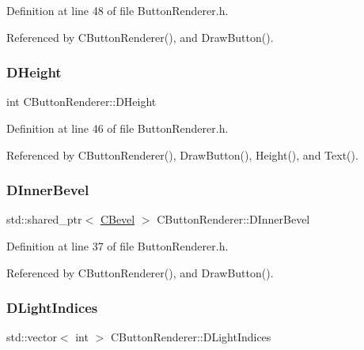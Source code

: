 Definition at line 48 of file Button\+Renderer.\+h.



Referenced by C\+Button\+Renderer(), and Draw\+Button().

\hypertarget{classCButtonRenderer_a7e3d605b90c45d87ac1396c23c90b250}{}\label{classCButtonRenderer_a7e3d605b90c45d87ac1396c23c90b250} 
\subsubsection{\texorpdfstring{D\+Height}{DHeight}}
{\footnotesize\ttfamily int C\+Button\+Renderer\+::\+D\+Height\hspace{0.3cm}{\ttfamily [protected]}}



Definition at line 46 of file Button\+Renderer.\+h.



Referenced by C\+Button\+Renderer(), Draw\+Button(), Height(), and Text().

\hypertarget{classCButtonRenderer_ab3c6dd552abb11fe7cd9db5d71648afb}{}\label{classCButtonRenderer_ab3c6dd552abb11fe7cd9db5d71648afb} 
\subsubsection{\texorpdfstring{D\+Inner\+Bevel}{DInnerBevel}}
{\footnotesize\ttfamily std\+::shared\+\_\+ptr$<$ \hyperlink{classCBevel}{C\+Bevel} $>$ C\+Button\+Renderer\+::\+D\+Inner\+Bevel\hspace{0.3cm}{\ttfamily [protected]}}



Definition at line 37 of file Button\+Renderer.\+h.



Referenced by C\+Button\+Renderer(), and Draw\+Button().

\hypertarget{classCButtonRenderer_a3f72c8f3b860fbaf43a372f112c11156}{}\label{classCButtonRenderer_a3f72c8f3b860fbaf43a372f112c11156} 
\subsubsection{\texorpdfstring{D\+Light\+Indices}{DLightIndices}}
{\footnotesize\ttfamily std\+::vector$<$ int $>$ C\+Button\+Renderer\+::\+D\+Light\+Indices\hspace{0.3cm}{\ttfamily [protected]}}



